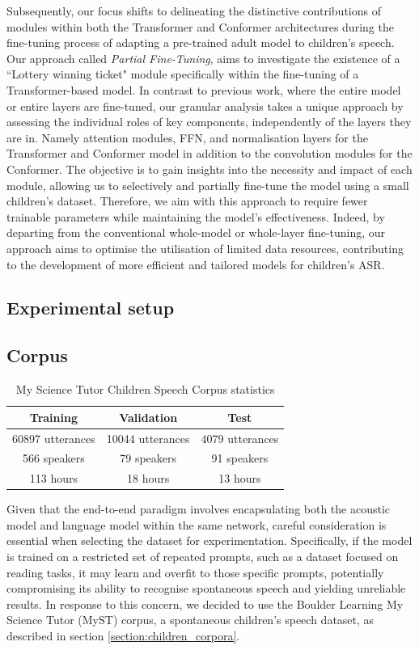 Subsequently, our focus shifts to delineating the distinctive contributions of modules within both the Transformer and Conformer architectures during the fine-tuning process of adapting a pre-trained adult model to children's speech. Our approach called \textit{Partial Fine-Tuning}, aims to investigate the existence of a ``Lottery winning ticket" module specifically within the fine-tuning of a Transformer-based model.
In contrast to previous work, where the entire model or entire layers are fine-tuned, our granular analysis takes a unique approach by assessing the individual roles of key components, independently of the layers they are in. Namely attention modules, \ac{FFN}, and normalisation layers for the Transformer and Conformer model in addition to the convolution modules for the Conformer. The objective is to gain insights into the necessity and impact of each module, allowing us to selectively and partially fine-tune the model using a small children's dataset. Therefore, we aim with this approach to require fewer trainable parameters while maintaining the model's effectiveness. Indeed, by departing from the conventional whole-model or whole-layer fine-tuning, our approach aims to optimise the utilisation of limited data resources, contributing to the development of more efficient and tailored models for children's \ac{ASR}.


\subsection{Experimental setup}
\label{section:methods_chapter4}

\subsection{Corpus}
\begin{table}[ht]
\centering
\begin{tabular}{c|c|c}
\hline
 Training & Validation     & Test   \\ \hline
60897 utterances  & 10044 utterances   & 4079 utterances \\ 
 566 speakers  & 79 speakers   & 91 speakers \\ 
 113 hours  & 18 hours   & 13 hours \\ \hline

\end{tabular}
\caption{My Science Tutor Children Speech Corpus statistics}
\label{tab:statistics_myst}
\end{table}
Given that the end-to-end paradigm involves encapsulating both the acoustic model and language model within the same network, careful consideration is essential when selecting the dataset for experimentation. Specifically, if the model is trained on a restricted set of repeated prompts, such as a dataset focused on reading tasks, it may learn and overfit to those specific prompts, potentially compromising its ability to recognise spontaneous speech and yielding unreliable results. In response to this concern, we decided to use the Boulder Learning My Science Tutor (MyST) corpus, a spontaneous children's speech dataset, as described in section \ref{section:children_corpora}. 

